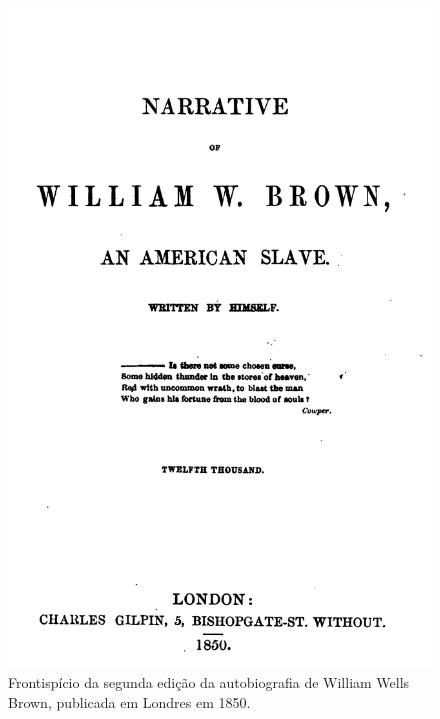 \pagebreak

\begin{absolutelynopagebreak}
\begin{vplace}
\begin{figure}[H]
\begin{adjustwidth}{-1.3cm}{}
  \vspace*{-2.5cm}
  \includegraphics[width=125mm]{./imgs/front2.jpg}  
\end{adjustwidth}
  \caption{Frontispício da segunda edição da autobiografia de William Wells Brown, publicada em Londres em 1850.}
\end{figure}
\end{vplace}

\thispagestyle{empty}
\end{absolutelynopagebreak}


